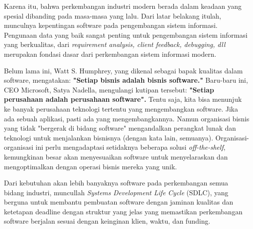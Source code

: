 
Karena itu, bahwa perkembangan industri modern berada dalam
keadaan yang spesial dibanding pada masa-masa yang lalu. Dari latar belakang itulah, munculnya
kepentingan software pada pengembangan
sistem informasi. Pengunaan data yang baik sangat penting untuk pengembangan sistem informasi yang
berkualitas, dari \emph{requirement analysis, client feedback, debugging, dll} merupakan fondasi dasar
dari perkembangan sistem informasi modern.

Belum lama ini, Watt S. Humphrey, yang dikenal sebagai bapak kualitas dalam software, mengatakan:
\textbf{"Setiap bisnis adalah bisnis software."}
Baru-baru ini, CEO Microsoft, Satya Nadella, mengulangi kutipan tersebut: 
\textbf{"Setiap perusahaan adalah perusahaan software".}\cite{BMC}
Tentu saja, kita bisa menunjuk ke banyak perusahaan teknologi tertentu yang mengembangkan software.
Jika ada sebuah aplikasi, pasti ada yang mengembangkannya.
Namun organisasi bisnis yang tidak "bergerak di bidang software" mengandalkan perangkat 
lunak dan teknologi untuk menjalankan bisnisnya (dengan kata lain, semuanya). 
Organisasi-organisasi ini perlu mengadaptasi setidaknya beberapa solusi \emph{off-the-shelf}, 
kemungkinan besar akan menyesuaikan software untuk menyelaraskan dan mengoptimalkan dengan 
operasi bisnis mereka yang unik.

Dari kebutuhan akan lebih banyaknya software pada perkembangan semua bidang industri,
muncullah \emph{Systems Development Life Cycle} (SDLC), yang berguna untuk membantu pembuatan software
dengan jaminan kualitas dan ketetapan deadline dengan struktur yang jelas yang memastikan perkembangan
software berjalan sesuai dengan keinginan klien, waktu, dan funding.